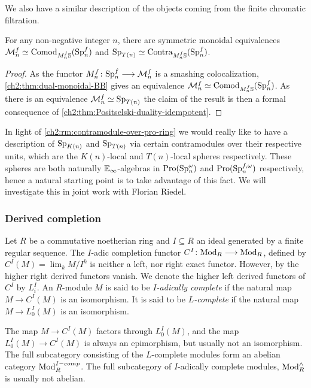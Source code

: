 We also have a similar description of the objects coming from the finite chromatic filtration. 

\begin{proposition}
    For any non-negative integer $n$, there are symmetric monoidal equivalences $\mathcal{M}_{n}^f \simeq \mathrm{Comod}_{M^f_n\mathbb{S}}(\mathrm{Sp}^f_n)$ and $\mathrm{Sp}_{T(n)}\simeq \mathrm{Contra}_{M^f_n\mathbb{S}}(\mathrm{Sp}^f_n)$.
\end{proposition}
\begin{proof}
    As the functor $M_n^f\colon \mathrm{Sp}_n^f \longrightarrow \mathcal{M}_n^f$ is a smashing colocalization, \cref{ch2:thm:dual-monoidal-BB} gives an equivalence $\mathcal{M}_n^f \simeq \mathrm{Comod}_{M_n^f \mathbb{S}}(\mathrm{Sp}_n^f)$. As there is an equivalence $\mathcal{M}_n^f \simeq \mathrm{Sp}_{T(n)}$ the claim of the result is then a formal consequence of \cref{ch2:thm:Positselski-duality-idempotent}.
\end{proof}

\begin{remark}
    In light of \cref{ch2:rm:contramodule-over-pro-ring} we would really like to have a description of $\mathrm{Sp}_{K(n)}$ and $\mathrm{Sp}_{T(n)}$ via certain contramodules over their respective units, which are the $K(n)$-local and $T(n)$-local spheres respectively. These spheres are both naturally $\mathbb{E}_\infty$-algebras in $\operatorname{Pro}(\mathrm{Sp}_n^\omega)$ and $\operatorname{Pro}(\mathrm{Sp}_n^{f, \omega})$ respectively, hence a natural starting point is to take advantage of this fact. We will investigate this in joint work with Florian Riedel. 
\end{remark}

\subsubsection*{Derived completion}
\label{ch2:ssec:derived-completion}

Let $R$ be a commutative noetherian ring and $I\subseteq R$ an ideal generated by a finite regular sequence. The $I$-adic completion functor $C^I\colon \mathrm{Mod}_R \longrightarrow \mathrm{Mod}_R$, defined by $C^I(M)=\lim_k M/I^k$ is neither a left, nor right exact functor. However, by \cite[5.1]{greenlees-may_92} the higher right derived functors vanish. We denote the higher left derived functors of $C^I$ by $L^I_i$. An $R$-module $M$ is said to be \emph{$I$-adically complete} if the natural map $M\to C^I (M)$ is an isomorphism. It is said to be \emph{$L$-complete} if the natural map $M\to L_0^I(M)$ is an isomorphism. 

The map $M\to C^I(M)$ factors through $L_0^I(M)$, and the map $L_0^I(M)\to C^I(M)$ is always an epimorphism, but usually not an isomorphism. The full subcategory consisting of the $L$-complete modules form an abelian category $\mathrm{Mod}_R^{I-comp}$. The full subcategory of $I$-adically complete modules, $\mathrm{Mod}_R^\wedge$ is usually not abelian. 

